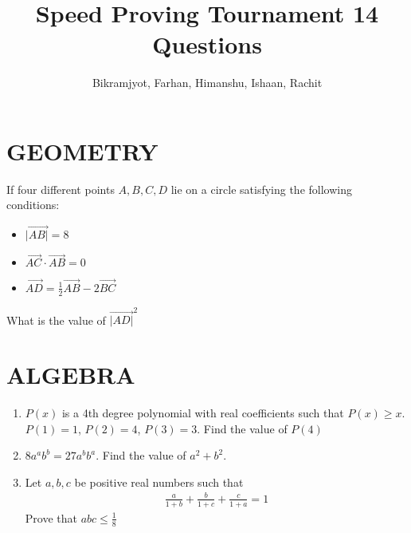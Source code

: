 \documentclass[12pt]{article}
\title{Speed Proving Tournament 14 Questions}
\author{Bikramjyot, Farhan, Himanshu, Ishaan, Rachit}
\begin{document}
\doublespacing
\maketitle

\section{GEOMETRY}

    If four different points $A, B, C, D$ lie on a circle satisfying the following conditions:
\begin{itemize}
  \item $\vec{|AB|} = 8$
  \item $\vec{AC} \cdot \vec{AB} = 0$
  \item $\vec{AD} = \frac{1}{2} \vec{AB} - 2 \vec{BC}$
\end{itemize}
What is the value of $\vec{|AD|}^2$


\section{ALGEBRA}

\begin{enumerate}
    \item $P(x)$ is a 4th degree polynomial with real coefficients such that $P(x) \geq x$.
    $P(1) = 1$, $P(2) = 4$, $P(3) = 3$.
    Find the value of $P(4)$
    \item $8a^ab^b = 27a^bb^a$. 
    Find the value of $a^2 + b^2$.
    \item Let $a,b,c$ be positive real numbers such that 
    \begin{align*}
        \frac{a}{1+b} + \frac{b}{1+c} + \frac{c}{1+a} = 1
    \end{align*}
    Prove that $abc \leq \frac{1}{8}$
\end{enumerate}
\end{document}
